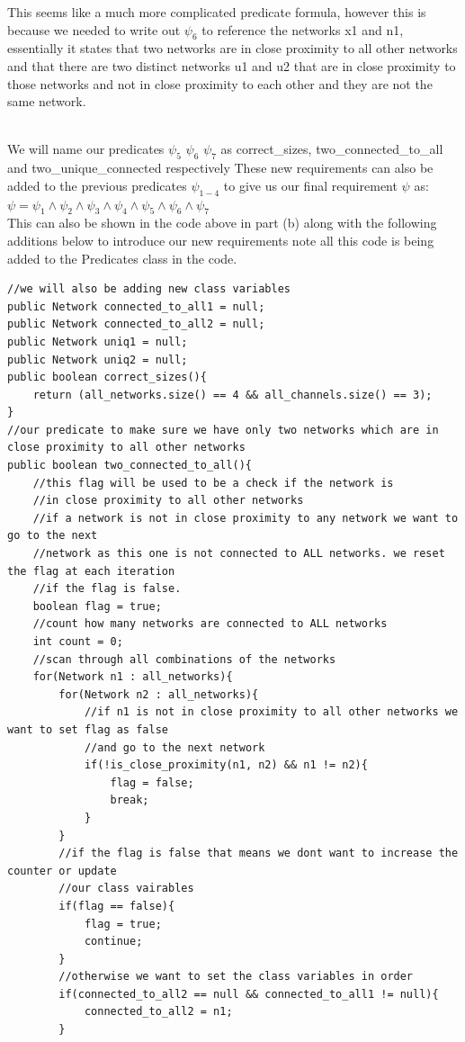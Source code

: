 \documentclass{article}
\begin{document}
\begin{enumerate}[(a)]
\begin{enumerate}[(1)]
            This seems like a much more complicated predicate formula, however this is because we needed to write out $\psi_6$ to reference the networks x1 and n1, essentially it states that two networks are in close proximity to all other networks and that there are two distinct networks u1 and u2 that are in close proximity to those networks and not in close proximity to each other and they are not the same network.
        \end{enumerate}
        \\We will name our predicates $\psi_5$ $\psi_6$ $\psi_7$ as correct\_sizes, two\_connected\_to\_all and two\_unique\_connected respectively
        These new requirements can also be added to the previous predicates $\psi_{1-4}$ to give us our final requirement $\psi$ as:\\
        $\psi = \psi_1 \land \psi_2 \land \psi_3 \land \psi_4 \land \psi_5 \land \psi_6 \land \psi_7$\\
        This can also be shown in the code above in part (b) along with the following additions below to introduce our new requirements note all this code is being added to the Predicates class in the code.
        \begin{lstlisting}
//we will also be adding new class variables
public Network connected_to_all1 = null;
public Network connected_to_all2 = null;
public Network uniq1 = null;
public Network uniq2 = null;
public boolean correct_sizes(){
    return (all_networks.size() == 4 && all_channels.size() == 3);
}
//our predicate to make sure we have only two networks which are in close proximity to all other networks
public boolean two_connected_to_all(){
    //this flag will be used to be a check if the network is
    //in close proximity to all other networks
    //if a network is not in close proximity to any network we want to go to the next
    //network as this one is not connected to ALL networks. we reset the flag at each iteration
    //if the flag is false.
    boolean flag = true;
    //count how many networks are connected to ALL networks
    int count = 0;
    //scan through all combinations of the networks
    for(Network n1 : all_networks){
        for(Network n2 : all_networks){
            //if n1 is not in close proximity to all other networks we want to set flag as false
            //and go to the next network
            if(!is_close_proximity(n1, n2) && n1 != n2){
                flag = false;
                break;
            }
        }
        //if the flag is false that means we dont want to increase the counter or update
        //our class vairables
        if(flag == false){
            flag = true;
            continue;
        }
        //otherwise we want to set the class variables in order
        if(connected_to_all2 == null && connected_to_all1 != null){
            connected_to_all2 = n1;
        }


\end{lstlisting}
\end{enumerate}
\end{document}

